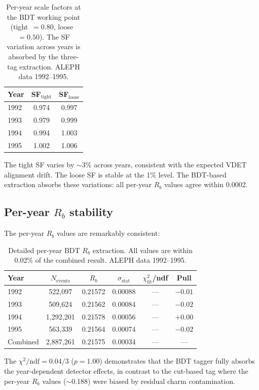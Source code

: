 \documentclass[11pt,a4paper]{article}
\begin{document}
\begin{table}[htbp]
\centering
\caption{Per-year scale factors at the BDT working point
  (tight~$= 0.80$, loose~$= 0.50$).  The SF variation across years is
  absorbed by the three-tag extraction.  ALEPH data 1992--1995.}
\label{tbl:per-year-sf}
\begin{tabular}{lcc}
\toprule
Year & SF$_\mathrm{tight}$ & SF$_\mathrm{loose}$ \\
\midrule
1992 & 0.974 & 0.997 \\
1993 & 0.979 & 0.999 \\
1994 & 0.994 & 1.003 \\
1995 & 1.002 & 1.006 \\
\bottomrule
\end{tabular}
\end{table}

The tight SF varies by $\sim$3\% across years, consistent with the
expected VDET alignment drift.  The loose SF is stable at the 1\% level.
The BDT-based extraction absorbs these variations: all per-year $R_b$
values agree within 0.0002.

\subsection{Per-year $R_b$ stability}

The per-year $R_b$ values are remarkably consistent:

\begin{table}[htbp]
\centering
\caption{Detailed per-year BDT $R_b$ extraction.  All values are within
  0.02\% of the combined result.  ALEPH data 1992--1995.}
\label{tbl:per-year-rb-detail}
\begin{tabular}{lccccc}
\toprule
Year & $N_\mathrm{events}$ & $R_b$ & $\sigma_\mathrm{stat}$ & $\chi^2_\mathrm{fit}$/ndf & Pull \\
\midrule
1992 &   522,097 & 0.21572 & 0.00088 & --- & $-0.01$ \\
1993 &   509,624 & 0.21562 & 0.00084 & --- & $-0.02$ \\
1994 & 1,292,201 & 0.21578 & 0.00056 & --- & $+0.00$ \\
1995 &   563,339 & 0.21564 & 0.00074 & --- & $-0.02$ \\
\midrule
Combined & 2,887,261 & 0.21575 & 0.00034 & --- & --- \\
\bottomrule
\end{tabular}
\end{table}

The $\chi^2/\mathrm{ndf} = 0.04/3$ ($p = 1.00$) demonstrates that the
BDT tagger fully absorbs the year-dependent detector effects, in contrast
to the cut-based tag where the per-year $R_b$ values ($\sim$0.188) were
biased by residual charm contamination.
\end{document}
